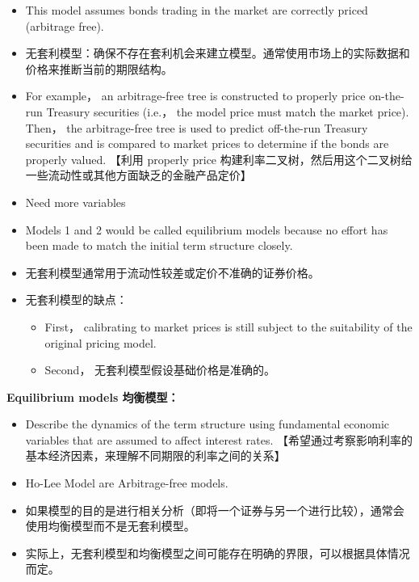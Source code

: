     \begin{itemize}
        \item This model assumes bonds trading in the market are correctly priced (arbitrage free).
        \item 无套利模型：确保不存在套利机会来建立模型。通常使用市场上的实际数据和价格来推断当前的期限结构。
        \item For example， an arbitrage-free tree is constructed to properly price on-the-run Treasury securities (i.e.， the model price must match the market price). Then， the arbitrage-free tree is used to predict off-the-run Treasury securities and is compared to market prices to determine if the bonds are properly valued. 【利用 properly price 构建利率二叉树，然后用这个二叉树给一些流动性或其他方面缺乏的金融产品定价】
    \end{itemize}

\begin{itemize}
    \item Need more variables
    \item Models 1 and 2 would be called equilibrium models because no effort has been made to match the initial term structure closely.
    \item 无套利模型通常用于流动性较差或定价不准确的证券价格。
    \item 无套利模型的缺点：
    \begin{itemize}
        \item First， calibrating to market prices is still subject to the suitability of the original pricing model.
        \item Second， 无套利模型假设基础价格是准确的。
    \end{itemize}
\end{itemize}

\textbf{Equilibrium models 均衡模型：}
\begin{itemize}
    \item Describe the dynamics of the term structure using fundamental economic variables that are assumed to affect interest rates. 【希望通过考察影响利率的基本经济因素，来理解不同期限的利率之间的关系】
    \item Ho-Lee Model are Arbitrage-free models.
    \item 如果模型的目的是进行相关分析（即将一个证券与另一个进行比较），通常会使用均衡模型而不是无套利模型。
    \item 实际上，无套利模型和均衡模型之间可能存在明确的界限，可以根据具体情况而定。
\end{itemize}


